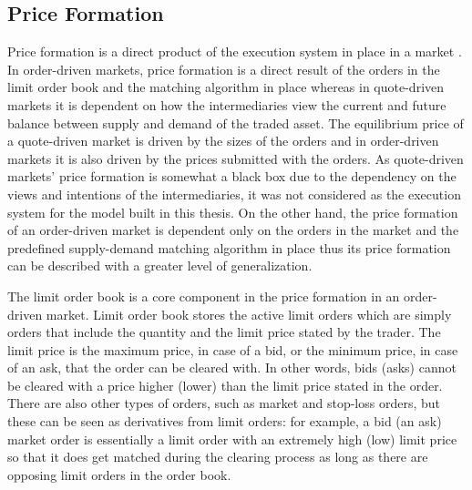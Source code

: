 \subsection{Price Formation}
Price formation is a direct product of the execution system in place in a market
\citep{boer05}. In order-driven markets, price formation is a direct result of the orders
in the limit order book and the matching algorithm in place whereas in quote-driven markets it
is dependent on how the intermediaries view the current and future 
balance between supply and demand of the traded asset. The equilibrium price of a 
quote-driven market is driven by the sizes of the orders and in order-driven markets
it is also driven by the prices submitted with the orders. \citep{MALINOVA2013104}
As quote-driven markets' price formation is somewhat a black box due to the 
dependency on the views and intentions of the intermediaries, it was not considered
as the execution system for the model built in this thesis. On the other hand, 
the price formation of an order-driven market is dependent only on the orders in the
market and the predefined supply-demand matching algorithm in place thus its price 
formation can be described with a greater level of generalization.

The limit order book is a core component in the price formation in an order-driven market.
Limit order book stores the active limit orders which are simply orders that include the quantity and 
the limit price stated by the trader. The limit price is the maximum price, in case of a bid, or the minimum
price, in case of an ask, that the order can be cleared with. In other words,
bids (asks) cannot be cleared with a price higher (lower) than the limit price stated 
in the order. There are also other types of orders, such as market and 
stop-loss orders, but these can be seen as derivatives from limit orders: 
for example, a bid (an ask) market order is essentially a limit order 
with an extremely high (low) limit price so that it does get matched 
during the clearing process as long as there are opposing limit orders in the 
order book. \citep{lob13} %


